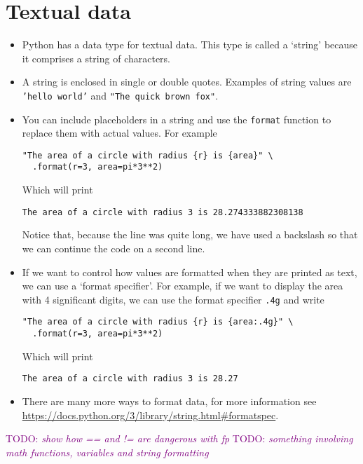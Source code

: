 \documentclass[a4paper,twoside]{memoir}
\makeatletter
\newcommand{\FrameTitle}[2]{%
  \fboxrule=\FrameRule \fboxsep=\FrameSep
  \fbox{\vbox{\nobreak \vskip -0.7\FrameSep
    \rlap{\centerline{\strut#1}}\nobreak\nointerlineskip%
    \vskip 0.7\FrameSep
    \hbox{#2}}}}
\newenvironment{framewithtitle}[2][\FrameFirst@Lab\ (cont.)]{%
  \def\FrameFirst@Lab{\textbf{#2}}%
  \def\FrameCont@Lab{\textbf{#1}}%
  \def\FrameCommand##1{%
    \FrameTitle{\FrameFirst@Lab}{##1}}%
  \def\FirstFrameCommand##1{%
    \FrameTitle{\FrameFirst@Lab}{##1}}%
  \def\MidFrameCommand##1{%
    \FrameTitle{\FrameCont@Lab}{##1}}%
  \def\LastFrameCommand##1{%
    \FrameTitle{\FrameCont@Lab}{##1}}%
\MakeFramed{\advance\hsize-\width \FrameRestore}}%
{\endMakeFramed}
\newcounter{exercisectr}
\newenvironment{exercise}
{\stepcounter{exercisectr}\begin{framewithtitle}{Practical \arabic{exercisectr}}}
{\end{framewithtitle}}
\newcommand{\shellcmd}{\texttt}
\newcommand{\TODO}[1]{\textcolor{purple}{TODO: \emph{#1}}}
\makeatother
\begin{document}
\section{Textual data}
\label{sec:textual}
\begin{itemize}
\item Python has a data type for textual data.  This type is called a `string' because it comprises a string of characters.
\item A string is enclosed in single or double quotes.  Examples of string values are \shellcmd{'hello world'} and \shellcmd{"The quick brown fox"}.
\item You can include placeholders in a string and use the \shellcmd{format} function to replace them with actual values.  For example
\begin{verbatim}
"The area of a circle with radius {r} is {area}" \
  .format(r=3, area=pi*3**2)
\end{verbatim}

Which will print
\begin{verbatim}
The area of a circle with radius 3 is 28.274333882308138
\end{verbatim}
Notice that, because the line was quite long, we have used a backslash so that we can continue the code on a second line.

\item If we want to control how values are formatted when they are printed as text, we can use a `format specifier'.  For example, if we want to display the area with 4 significant digits, we can use the format specifier \shellcmd{.4g} and write
\begin{verbatim}
"The area of a circle with radius {r} is {area:.4g}" \
  .format(r=3, area=pi*3**2)
\end{verbatim}

Which will print
\begin{verbatim}The area of a circle with radius 3 is 28.27\end{verbatim}

\item There are many more ways to format data, for more information see \url{https://docs.python.org/3/library/string.html#formatspec}.

\end{itemize}

\begin{exercise}
\TODO{show how == and != are dangerous with fp}
\TODO{something involving math functions, variables and string formatting}
\end{exercise}
\end{document}

